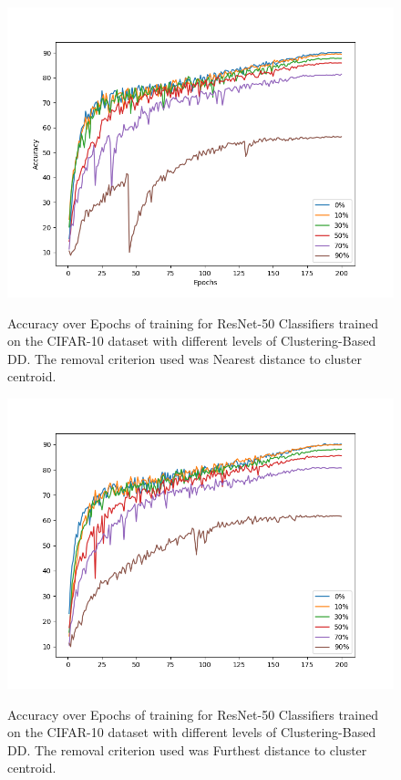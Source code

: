 \begin{figure}
    \centering
    \caption[Accuracy on CIFAR-10 using sample removal on nearest distance to cluster centroid]{Accuracy over Epochs of training for ResNet-50 Classifiers trained on the CIFAR-10 dataset with different levels of Clustering-Based DD. The removal criterion used was Nearest distance to cluster centroid.}
    \includegraphics[width=1\linewidth]{fig_datadistill/cifar_results_nearest.png}
    \label{fig:cifar_results_nearest}
\end{figure}


\begin{figure}
    \centering
    \caption[Accuracy on CIFAR-10 using removal on furthest distance to cluster centroid]{Accuracy over Epochs of training for ResNet-50 Classifiers trained on the CIFAR-10 dataset with different levels of Clustering-Based DD. The removal criterion used was Furthest distance to cluster centroid.}
    \includegraphics[width=1\linewidth]{fig_datadistill/cifar_results_furthest.png}
    \label{fig:cifar_results_furthest}
\end{figure}


